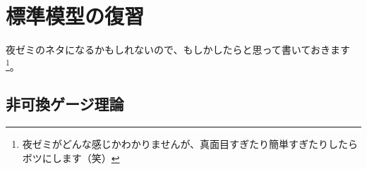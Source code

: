 \documentclass[unicode,a4paper,10pt]{ltjsarticle}
\renewcommand{\theequation}{\thesection.\arabic{equation}}
\renewcommand{\thefigure}{\thesection.\arabic{figure}}
\renewcommand{\thetable}{\thesection.\arabic{table}}
\begin{document}

\clearpage
\makeatletter
\renewcommand{\appendix}{\par
  \setcounter{section}{0}%
  \setcounter{subsection}{0}%
  \gdef\presectionname{\appendixname}%
  \gdef\postsectionname{}%
  \gdef\thesection{\presectionname\@Alph\c@section\postsectionname}%
  \gdef\thesubsection{\@Alph\c@section.\@arabic\c@subsection}%
  \renewcommand{\theequation}{\@Alph\c@section.\arabic{equation}}%
  \renewcommand{\thefigure}{\@Alph\c@section.\arabic{figure}}%
  \renewcommand{\thetable}{\@Alph\c@section.\arabic{table}}%
}
\makeatother
\appendix


\section{標準模型の復習}

夜ゼミのネタになるかもしれないので、もしかしたらと思って書いておきます\footnote{
   夜ゼミがどんな感じかわかりませんが、真面目すぎたり簡単すぎたりしたらボツにします（笑）
}。

\subsection{非可換ゲージ理論}


















\clearpage



\nocite{Peskin:1995}
\nocite{Fujii:2005}
\end{document}
